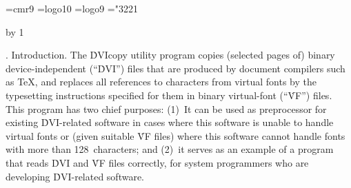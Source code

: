 
%
%
%

\def\hang{\hangindent 3em\indent\ignorespaces}
\font\ninerm=cmr9
\let\mc=\ninerm %
\def\PASCAL{Pascal}
\font\tenlogo=logo10 %
\font\ninelogo=logo9 %
\let\logo=\tenlogo
\def\MF{{\logo META}\-{\logo FONT}}
\mathchardef\RA="3221 %

\def\(#1){} %
\def\9#1{} %

\def\title{DVI\lowercase{copy}}
\def\contentspagenumber{1}
\def\topofcontents{\null
  \def\titlepage{F} %
  \def\rheader{\mainfont\hfil \contentspagenumber}
  \vfill
  \centerline{\titlefont The {\ttitlefont DVIcopy} processor}
  \vskip 5pt
  \centerline{Copyright (C) 1990,91 Peter Breitenlohner}
  \centerline{Distributed under terms of GNU General Public License}
  \vskip 15pt
  \centerline{(Version 1.2, February 1991)}
  \vfill}
\def\botofcontents{\vfill
  \centerline{\hsize 5in\baselineskip9pt
    \vbox{\ninerm \let\logo=\ninelogo \noindent
    This program was developed at the
    Max-Planck-Institut f\"ur Physik
    (Werner-Heisenberg-Institut), Munich, Germany.
    `\TeX' is a trademark of the American Mathematical Society.
    `\MF' is a trademark of Addison-Wesley
    Publishing Company.}}}
\pageno=\contentspagenumber \advance\pageno by 1


.  Introduction.
The \.{DVIcopy} utility program copies (selected pages of) binary
device-independent (``\.{DVI}'') files that are produced by document
compilers such as \TeX, and replaces all references to characters from
virtual fonts by the typesetting instructions specified for them in
binary virtual-font (``\.{VF}'') files.
This program has two chief purposes: (1)~It can be used as preprocessor
for existing \.{DVI}-related software in cases where this software is
unable to handle virtual fonts or (given suitable \.{VF} files) where
this software cannot handle fonts with more than 128~characters;
and (2)~it serves as an example of a program that reads \.{DVI} and
\.{VF} files correctly, for system programmers who are developing
\.{DVI}-related software.

